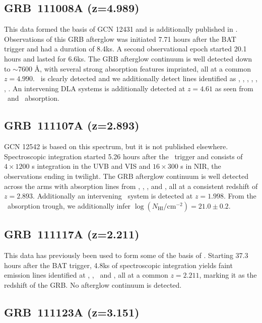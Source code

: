 \documentclass{aa}    %
\begin{document}
\subsection{GRB~111008A  (z=4.989)} \label{111008}

This data formed the basis of GCN 12431 \citep{GCN12431} and is additionally
published in \citet{Sparre2014}. Observations of this GRB afterglow was
initiated 7.71 hours after the BAT trigger and had a duration of 8.4ks. A second
observational epoch started 20.1 hours and lasted for 6.6ks. The GRB afterglow
continuum is well detected down to $\sim$7600 \AA, with several strong
absorption features imprinted, all at a common $z = 4.990$. \lya~is clearly
detected and we additionally detect lines identified as \SIii, \feii, \civ,
\mgii, \SIii*, \sii*, \oi*. An intervening DLA systems is additionally detected
at  $z = 4.61$ as seen from \lya~and \mgii~absorption.

\subsection{GRB~111107A (z=2.893)} \label{111107}

GCN  12542 \citep{GCN12542} is based on this spectrum, but it is not published
elsewhere. Spectroscopic integration started 5.26 hours after the \swift~trigger
and consists of $4 \times 1200$ s integration in the UVB and VIS and $16 \times
300$ s in NIR, the observations ending in twilight. The GRB afterglow continuum
is well detected across the arms with absorption lines from \lya, \civ, \feii,
and \mgii, all at a consistent redshift of $z = 2.893$. Additionally an
intervening \mgii~system is detected at $z = 1.998$. From the \lya~absorption
trough, we additionally infer $\log (N_{\mathrm{HI}}/\mathrm{cm}^{-2}) = 21.0
\pm 0.2$.

\subsection{GRB~111117A (z=2.211)} \label{111117}

This data has previously been used to form some of the basis of
\citet{Selsing2017}. Starting 37.3 hours after the BAT trigger, 4.8ks of
spectroscopic integration yields faint emission lines identified at \oii, \hb,
\oiii~and \ha, all at a common $z = 2.211$, marking it as the redshift of the
GRB. No afterglow continuum is detected.

\subsection{GRB~111123A  (z=3.151)} \label{111123}
\end{document}
